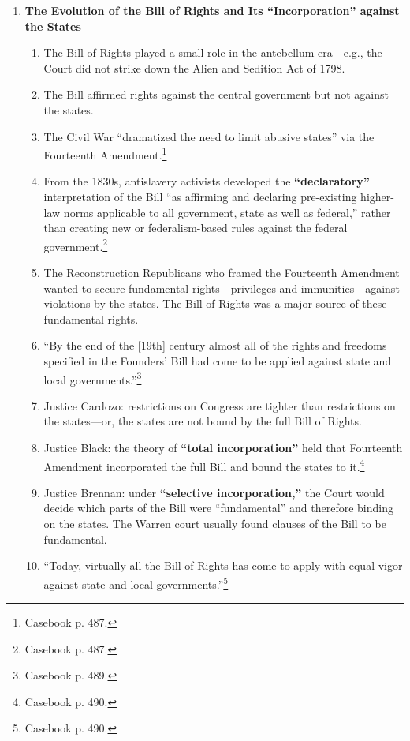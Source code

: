 \begin{enumerate}
    \item \textbf{The Evolution of the Bill of Rights and Its 
    ``Incorporation'' against the States}
    \begin{enumerate}
        \item The Bill of Rights played a small role in the antebellum 
        era---e.g., the Court did not strike down the Alien and Sedition Act 
        of 1798.
        \item The Bill affirmed rights against the central government but not 
        against the states.
        \item The Civil War ``dramatized the need to limit abusive states'' 
        via the Fourteenth Amendment.\footnote{Casebook p. 487.}
        \item From the 1830s, antislavery activists developed the 
        \textbf{``declaratory''} interpretation of the Bill ``as affirming and 
        declaring pre-existing higher-law norms applicable to all government, 
        state as well as federal,'' rather than creating new or 
        federalism-based rules against the federal 
        government.\footnote{Casebook p. 487.}
        \item The Reconstruction Republicans who framed the Fourteenth 
        Amendment wanted to secure fundamental rights---privileges and 
        immunities---against violations by the states. The Bill of Rights was 
        a major source of these fundamental rights.
        \item ``By the end of the [19th] century almost all of the rights and 
        freedoms specified in the Founders' Bill had come to be applied 
        against state and local governments.''\footnote{Casebook p. 489.}
        \item Justice Cardozo: restrictions on Congress are tighter than 
        restrictions on the states---or, the states are not bound by the full 
        Bill of Rights.
        \item Justice Black: the theory of \textbf{``total incorporation''} 
        held that Fourteenth Amendment incorporated the full Bill and bound 
        the states to it.\footnote{Casebook p. 490.} 
        \item Justice Brennan: under \textbf{``selective incorporation,''} the 
        Court would decide which parts of the Bill were ``fundamental'' and 
        therefore binding on the states. The Warren court usually found 
        clauses of the Bill to be fundamental.
        \item ``Today, virtually all the Bill of Rights has come to apply with 
        equal vigor against state and local governments.''\footnote{Casebook 
        p. 490.}
    \end{enumerate}
\end{enumerate}

